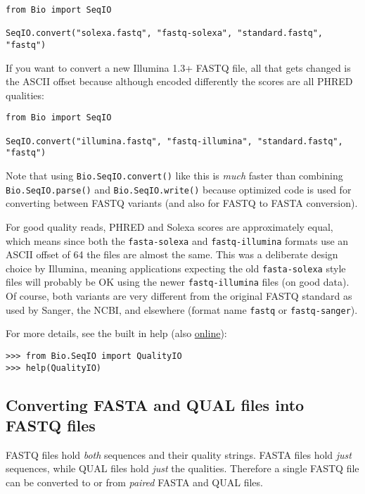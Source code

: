 \begin{verbatim}
from Bio import SeqIO

SeqIO.convert("solexa.fastq", "fastq-solexa", "standard.fastq", "fastq")
\end{verbatim}

If you want to convert a new Illumina 1.3+ FASTQ file, all that gets changed
is the ASCII offset because although encoded differently the scores are all
PHRED qualities:

\begin{verbatim}
from Bio import SeqIO

SeqIO.convert("illumina.fastq", "fastq-illumina", "standard.fastq", "fastq")
\end{verbatim}

Note that using \verb|Bio.SeqIO.convert()| like this is \emph{much} faster
than combining \verb|Bio.SeqIO.parse()| and \verb|Bio.SeqIO.write()|
because optimized code is used for converting between FASTQ variants
(and also for FASTQ to FASTA conversion).

For good quality reads, PHRED and Solexa scores are approximately equal,
which means since both the \texttt{fasta-solexa} and \texttt{fastq-illumina}
formats use an ASCII offset of 64 the files are almost the same. This was a
deliberate design choice by Illumina, meaning applications expecting the old
\texttt{fasta-solexa} style files will probably be OK using the newer
\texttt{fastq-illumina} files (on good data). Of course, both variants are
very different from the original FASTQ standard as used by Sanger,
the NCBI, and elsewhere (format name \texttt{fastq} or \texttt{fastq-sanger}).

For more details, see the built in help (also \href{http://www.biopython.org/docs/\bpversion/api/Bio.SeqIO.QualityIO.html}{online}):

\begin{verbatim}
>>> from Bio.SeqIO import QualityIO
>>> help(QualityIO)
\end{verbatim}

\subsection{Converting FASTA and QUAL files into FASTQ files}
\label{sec:SeqIO-fasta-qual-conversion}

FASTQ files hold \emph{both} sequences and their quality strings.
FASTA files hold \emph{just} sequences, while QUAL files hold \emph{just}
the qualities. Therefore a single FASTQ file can be converted to or from
\emph{paired} FASTA and QUAL files.

